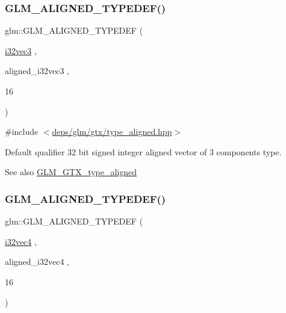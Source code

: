 \subsubsection{\texorpdfstring{G\+L\+M\+\_\+\+A\+L\+I\+G\+N\+E\+D\+\_\+\+T\+Y\+P\+E\+D\+E\+F()}{GLM\_ALIGNED\_TYPEDEF()}\hspace{0.1cm}{\footnotesize\ttfamily [63/209]}}
{\footnotesize\ttfamily glm\+::\+G\+L\+M\+\_\+\+A\+L\+I\+G\+N\+E\+D\+\_\+\+T\+Y\+P\+E\+D\+EF (\begin{DoxyParamCaption}\item[{\hyperlink{group__gtc__type__precision_ga9811a4ec26e517ea85c785d3f3f4baac}{i32vec3}}]{,  }\item[{aligned\+\_\+i32vec3}]{,  }\item[{16}]{ }\end{DoxyParamCaption})}



{\ttfamily \#include $<$\hyperlink{gtx_2type__aligned_8hpp}{deps/glm/gtx/type\+\_\+aligned.\+hpp}$>$}

Default qualifier 32 bit signed integer aligned vector of 3 components type. \begin{DoxySeeAlso}{See also}
\hyperlink{group__gtx__type__aligned}{G\+L\+M\+\_\+\+G\+T\+X\+\_\+type\+\_\+aligned} 
\end{DoxySeeAlso}
\mbox{\label{group__gtx__type__aligned_gad2ecbdea18732163e2636e27b37981ee}} 
\subsubsection{\texorpdfstring{G\+L\+M\+\_\+\+A\+L\+I\+G\+N\+E\+D\+\_\+\+T\+Y\+P\+E\+D\+E\+F()}{GLM\_ALIGNED\_TYPEDEF()}\hspace{0.1cm}{\footnotesize\ttfamily [64/209]}}
{\footnotesize\ttfamily glm\+::\+G\+L\+M\+\_\+\+A\+L\+I\+G\+N\+E\+D\+\_\+\+T\+Y\+P\+E\+D\+EF (\begin{DoxyParamCaption}\item[{\hyperlink{group__gtc__type__precision_ga78c16dde5527264e8085b375efba6f28}{i32vec4}}]{,  }\item[{aligned\+\_\+i32vec4}]{,  }\item[{16}]{ }\end{DoxyParamCaption})}



